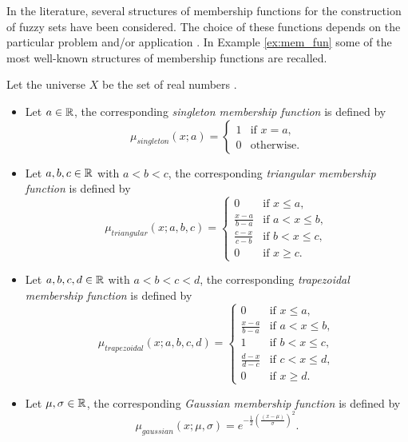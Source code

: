 In the literature, several structures of membership functions for the construction of fuzzy sets have been considered. The choice of these functions depends on the particular problem and/or application \cite{Mitaim1996}. In Example \ref{ex:mem_fun} some of the most well-known structures of membership functions are recalled.

\begin{example}\label{ex:mem_fun}
Let the universe $X$ be the set of real numbers \RR.
	\begin{itemize}
		\item Let $a \in \mathbb{R}$, the corresponding \emph{singleton membership function} is defined by
		$$
		\mu_{singleton}(x;a)= \left\{ \begin{array}{ll}
			1 &  \text{if }  x =a, \\
			0 & \text{otherwise}.
		\end{array}
		\right.
		$$
		\item Let $a,b,c \in \mathbb{R}$ with $a<b<c$, the corresponding \emph{triangular membership function} is defined by
		$$
		\mu_{triangular}(x;a,b,c)= \left\{ \begin{array}{ll}
			0 &  \text{if }  x \leq a, \\[3pt]
			\frac{x-a}{b-a} & \text{if }  a < x \leq b,\\[3pt]
			\frac{c-x}{c-b} &  \text{if }  b < x \leq c, \\[3pt]
			0 &  \text{if } x \geq c.
		\end{array}
		\right.
		$$
		\item Let $a,b,c,d \in \mathbb{R}$ with $a<b<c<d$, the corresponding \emph{trapezoidal membership function} is defined by
				$$
		\mu_{trapezoidal}(x;a,b,c,d)= \left\{ \begin{array}{ll}
			0 &  \text{if }  x \leq a, \\[3pt]
			\frac{x-a}{b-a} & \text{if }  a < x \leq b,\\[3pt]
			1 & \text{if } b < x \leq c, \\[3pt]
			\frac{d-x}{d-c} &  \text{if }  c < x \leq d, \\[3pt]
			0 &  \text{if } x \geq d.
		\end{array}
		\right.
		$$
		\item Let $\mu, \sigma \in \mathbb{R}$, the corresponding \emph{Gaussian membership function} is defined by
		$$
		\mu_{gaussian}(x;\mu,\sigma)= e^{-\frac{1}{2} \left(\frac{(x-\mu)}{\sigma}\right)^2}.
		$$
	\end{itemize}
\end{example}

